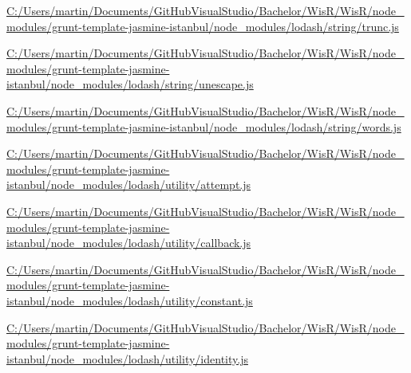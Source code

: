\begin{DoxyCompactItemize}
\item 
\hyperlink{_c_1_2_users_2martin_2_documents_2_git_hub_visual_studio_2_bachelor_2_wis_r_2_wis_r_2node_module80334f34be64a6bf5e7948bee54401ff}{C\+:/\+Users/martin/\+Documents/\+Git\+Hub\+Visual\+Studio/\+Bachelor/\+Wis\+R/\+Wis\+R/node\+\_\+modules/grunt-\/template-\/jasmine-\/istanbul/node\+\_\+modules/lodash/string/trunc.\+js}
\item 
\hyperlink{_c_1_2_users_2martin_2_documents_2_git_hub_visual_studio_2_bachelor_2_wis_r_2_wis_r_2node_modulea8091d13ce08316d60903ff85ba9589f}{C\+:/\+Users/martin/\+Documents/\+Git\+Hub\+Visual\+Studio/\+Bachelor/\+Wis\+R/\+Wis\+R/node\+\_\+modules/grunt-\/template-\/jasmine-\/istanbul/node\+\_\+modules/lodash/string/unescape.\+js}
\item 
\hyperlink{_c_1_2_users_2martin_2_documents_2_git_hub_visual_studio_2_bachelor_2_wis_r_2_wis_r_2node_module35760bdbf98e20d48d641688dff4f16a}{C\+:/\+Users/martin/\+Documents/\+Git\+Hub\+Visual\+Studio/\+Bachelor/\+Wis\+R/\+Wis\+R/node\+\_\+modules/grunt-\/template-\/jasmine-\/istanbul/node\+\_\+modules/lodash/string/words.\+js}
\item 
\hyperlink{_c_1_2_users_2martin_2_documents_2_git_hub_visual_studio_2_bachelor_2_wis_r_2_wis_r_2node_module12c6eb4a9b249d319b37fcdecafb8c1a}{C\+:/\+Users/martin/\+Documents/\+Git\+Hub\+Visual\+Studio/\+Bachelor/\+Wis\+R/\+Wis\+R/node\+\_\+modules/grunt-\/template-\/jasmine-\/istanbul/node\+\_\+modules/lodash/utility/attempt.\+js}
\item 
\hyperlink{_c_1_2_users_2martin_2_documents_2_git_hub_visual_studio_2_bachelor_2_wis_r_2_wis_r_2node_module08d1a19557b8b1dc3c7501af5888cc69}{C\+:/\+Users/martin/\+Documents/\+Git\+Hub\+Visual\+Studio/\+Bachelor/\+Wis\+R/\+Wis\+R/node\+\_\+modules/grunt-\/template-\/jasmine-\/istanbul/node\+\_\+modules/lodash/utility/callback.\+js}
\item 
\hyperlink{_c_1_2_users_2martin_2_documents_2_git_hub_visual_studio_2_bachelor_2_wis_r_2_wis_r_2node_module52582e7307406ecf6afad5add7ea05e2}{C\+:/\+Users/martin/\+Documents/\+Git\+Hub\+Visual\+Studio/\+Bachelor/\+Wis\+R/\+Wis\+R/node\+\_\+modules/grunt-\/template-\/jasmine-\/istanbul/node\+\_\+modules/lodash/utility/constant.\+js}
\item 
\hyperlink{_c_1_2_users_2martin_2_documents_2_git_hub_visual_studio_2_bachelor_2_wis_r_2_wis_r_2node_module4e61b1fe888b9cbb63d54e56b2ffa647}{C\+:/\+Users/martin/\+Documents/\+Git\+Hub\+Visual\+Studio/\+Bachelor/\+Wis\+R/\+Wis\+R/node\+\_\+modules/grunt-\/template-\/jasmine-\/istanbul/node\+\_\+modules/lodash/utility/identity.\+js}

\end{DoxyCompactItemize}
